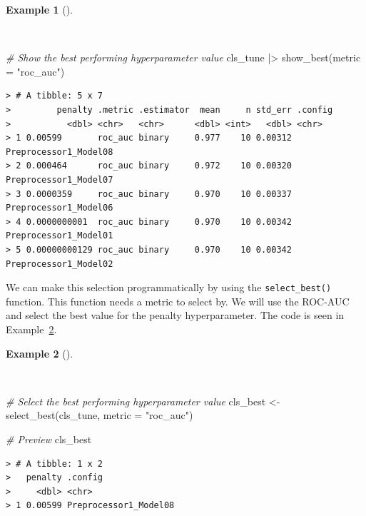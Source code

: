 \documentclass[
  letterpaper,
  DIV=11,
  numbers=noendperiod]{scrreprt}
\newenvironment{Shaded}{\begin{snugshade}}{\end{snugshade}}
\newcommand{\AttributeTok}[1]{\textcolor[rgb]{0.00,0.00,0.00}{#1}}
\newcommand{\CommentTok}[1]{\textcolor[rgb]{0.00,0.00,0.00}{\textit{#1}}}
\newcommand{\FunctionTok}[1]{\textcolor[rgb]{0.00,0.00,0.00}{#1}}
\newcommand{\NormalTok}[1]{\textcolor[rgb]{0.00,0.00,0.00}{#1}}
\newcommand{\OtherTok}[1]{\textcolor[rgb]{0.00,0.00,0.00}{#1}}
\newcommand{\SpecialCharTok}[1]{\textcolor[rgb]{0.00,0.00,0.00}{#1}}
\newcommand{\StringTok}[1]{\textcolor[rgb]{0.00,0.00,0.00}{#1}}
\theoremstyle{definition}
\newtheorem{example}{Example}[chapter]
\theoremstyle{remark}
\begin{document}
\begin{example}[]\protect\hypertarget{exm-pda-class-model-spec-tune-grid-collect-best}{}\label{exm-pda-class-model-spec-tune-grid-collect-best}

~

\begin{Shaded}
\begin{Highlighting}[]
\CommentTok{\# Show the best performing hyperparameter value}
\NormalTok{cls\_tune }\SpecialCharTok{|\textgreater{}}
  \FunctionTok{show\_best}\NormalTok{(}\AttributeTok{metric =} \StringTok{"roc\_auc"}\NormalTok{)}
\end{Highlighting}
\end{Shaded}

\begin{verbatim}
> # A tibble: 5 x 7
>         penalty .metric .estimator  mean     n std_err .config              
>           <dbl> <chr>   <chr>      <dbl> <int>   <dbl> <chr>                
> 1 0.00599       roc_auc binary     0.977    10 0.00312 Preprocessor1_Model08
> 2 0.000464      roc_auc binary     0.972    10 0.00320 Preprocessor1_Model07
> 3 0.0000359     roc_auc binary     0.970    10 0.00337 Preprocessor1_Model06
> 4 0.0000000001  roc_auc binary     0.970    10 0.00342 Preprocessor1_Model01
> 5 0.00000000129 roc_auc binary     0.970    10 0.00342 Preprocessor1_Model02
\end{verbatim}

\end{example}

We can make this selection programmatically by using the
\texttt{select\_best()} function. This function needs a metric to select
by. We will use the ROC-AUC and select the best value for the penalty
hyperparameter. The code is seen in
Example~\ref{exm-pda-class-model-spec-tune-grid-collect-select}.

\begin{example}[]\protect\hypertarget{exm-pda-class-model-spec-tune-grid-collect-select}{}\label{exm-pda-class-model-spec-tune-grid-collect-select}

~

\begin{Shaded}
\begin{Highlighting}[]
\CommentTok{\# Select the best performing hyperparameter value}
\NormalTok{cls\_best }\OtherTok{\textless{}{-}}
  \FunctionTok{select\_best}\NormalTok{(cls\_tune, }\AttributeTok{metric =} \StringTok{"roc\_auc"}\NormalTok{)}

\CommentTok{\# Preview}
\NormalTok{cls\_best}
\end{Highlighting}
\end{Shaded}

\begin{verbatim}
> # A tibble: 1 x 2
>   penalty .config              
>     <dbl> <chr>                
> 1 0.00599 Preprocessor1_Model08
\end{verbatim}

\end{example}
\end{document}
